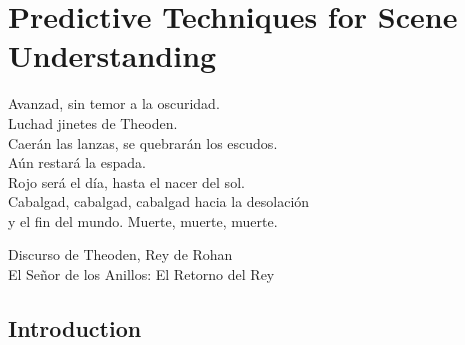 % 
% 
% 
% 
% 
% 
% 

\chapter{Predictive Techniques for Scene Understanding}
\label{cha:predictive_techniques}

\begin{FraseCelebre}
	\begin{Frase}
		Avanzad, sin temor a la oscuridad. \\
		Luchad jinetes de Theoden. \\
		Caerán las lanzas, se quebrarán los escudos. \\
		Aún restará la espada. \\
		Rojo será el día, hasta el nacer del sol. \\
		Cabalgad, cabalgad, cabalgad hacia la desolación \\ 
		y el fin del mundo. Muerte, muerte, muerte.
	\end{Frase}
	\begin{Fuente}
		Discurso de Theoden, Rey de Rohan \\
		El Señor de los Anillos: El Retorno del Rey
	\end{Fuente}
\end{FraseCelebre}

\section{Introduction}
\label{sec:4_introduction}

